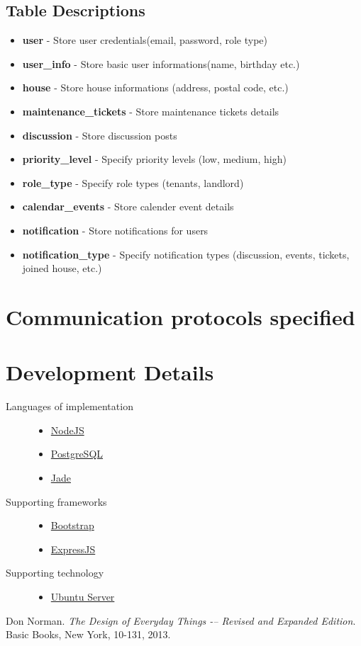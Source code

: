 \documentclass[12pt]{article}
\begin{document}
\subsection{Table Descriptions}
\begin{itemize}
    \item \textbf{user} - Store user credentials(email, password, role type)
    \item \textbf{user\_info} - Store basic user informations(name, birthday etc.)
    \item \textbf{house} - Store house informations (address, postal code, etc.)
    \item \textbf{maintenance\_tickets} - Store maintenance tickets details
    \item \textbf{discussion} - Store discussion posts
    \item \textbf{priority\_level} - Specify priority levels (low, medium, high)
    \item \textbf{role\_type} - Specify role types (tenants, landlord)
    \item \textbf{calendar\_events} - Store calender event details
    \item \textbf{notification} - Store notifications for users
    \item \textbf{notification\_type} - Specify notification types (discussion, events, tickets, joined house, etc.)
    
\end{itemize}
%
\section{Communication protocols specified}

%
\section{Development Details}
\begin{description}
  \item[Languages of implementation] \hfill
    \begin{itemize}
      \item \href{https://nodejs.org/en/}{NodeJS}
      \item \href{http://www.postgresql.org/}{PostgreSQL}
      \item \href{http://jade-lang.com/}{Jade}
    \end{itemize}
  \item[Supporting frameworks] \hfill
    \begin{itemize}
      \item \href{http://getbootstrap.com/}{Bootstrap}
      \item \href{http://expressjs.com/}{ExpressJS}
    \end{itemize}
  \item[Supporting technology] \hfill
    \begin{itemize}
      \item \href{http://www.ubuntu.com/server}{Ubuntu Server}
    \end{itemize}
\end{description}

\begin{thebibliography}{9}
Don Norman. 
\textit{The Design of Everyday Things -– Revised and Expanded Edition}. 
Basic Books, New York, 10-131, 2013.
\end{thebibliography}
\end{document}

